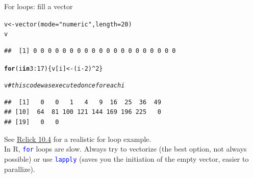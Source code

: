 \documentclass[xcolor=table,       handout,    xcolor=dvipsnames]{beamer}\usepackage[]{graphicx}\usepackage[]{color}
\makeatletter
\newcommand{\hlnum}[1]{\textcolor[rgb]{0,0,0}{#1}}
\newcommand{\hlstr}[1]{\textcolor[rgb]{0.545,0.137,0.137}{#1}}
\newcommand{\hlcom}[1]{\textcolor[rgb]{0,0.392,0}{\textit{#1}}}
\newcommand{\hlopt}[1]{\textcolor[rgb]{0,0,0}{#1}}
\newcommand{\hlstd}[1]{\textcolor[rgb]{0,0,0}{#1}}
\newcommand{\hlkwa}[1]{\textcolor[rgb]{1,0,0}{\textbf{#1}}}
\newcommand{\hlkwb}[1]{\textcolor[rgb]{0,0,0}{#1}}
\newcommand{\hlkwc}[1]{\textcolor[rgb]{1,0,1}{#1}}
\newcommand{\hlkwd}[1]{\textcolor[rgb]{0,0,1}{#1}}
\newenvironment{kframe}{%
 \def\at@end@of@kframe{}%
 \ifinner\ifhmode%
  \def\at@end@of@kframe{\end{minipage}}%
  \begin{minipage}{\columnwidth}%
 \fi\fi%
 \def\FrameCommand##1{\hskip\@totalleftmargin \hskip-\fboxsep
 \colorbox{shadecolor}{##1}\hskip-\fboxsep
     \hskip-\linewidth \hskip-\@totalleftmargin \hskip\columnwidth}%
 \MakeFramed {\advance\hsize-\width
   \@totalleftmargin\z@ \linewidth\hsize
   \@setminipage}}%
 {\par\unskip\endMakeFramed%
 \at@end@of@kframe}
\newenvironment{knitrout}{}{} %
\newcommand{\rcode}[1]{\texttt{\textcolor{Blue}{#1}}} %
\makeatother
\begin{document}

\begin{frame}[fragile]{For loops: fill a vector}
\begin{knitrout}
\color{fgcolor}\begin{kframe}
\begin{alltt}
\hlstd{v} \hlkwb{<-} \hlkwd{vector}\hlstd{(}\hlkwc{mode}\hlstd{=}\hlstr{"numeric"}\hlstd{,} \hlkwc{length}\hlstd{=}\hlnum{20}\hlstd{)}
\hlstd{v}
\end{alltt}
\begin{verbatim}
##  [1] 0 0 0 0 0 0 0 0 0 0 0 0 0 0 0 0 0 0 0 0
\end{verbatim}
\end{kframe}
\end{knitrout}
\pause \vspace{-1em}
\begin{knitrout}
\color{fgcolor}\begin{kframe}
\begin{alltt}
\hlkwa{for}\hlstd{(i} \hlkwa{in} \hlnum{3}\hlopt{:}\hlnum{17}\hlstd{)  \{  v[i]} \hlkwb{<-} \hlstd{(i}\hlopt{-}\hlnum{2}\hlstd{)}\hlopt{^}\hlnum{2}  \hlstd{\}}
\end{alltt}
\end{kframe}
\end{knitrout}
\pause \vspace{-1em}
\begin{knitrout}
\color{fgcolor}\begin{kframe}
\begin{alltt}
\hlstd{v} \hlcom{# this code was executed once for each i}
\end{alltt}
\begin{verbatim}
##  [1]   0   0   1   4   9  16  25  36  49
## [10]  64  81 100 121 144 169 196 225   0
## [19]   0   0
\end{verbatim}
\end{kframe}
\end{knitrout}
\pause \vspace{-0.5em}
See \href{https://rclickhandbuch.wordpress.com/hauptseite/}{Rclick 10.4} for a realistic for loop example.\\
\pause 
In R, \rcode{for} loops are slow. Always try to vectorize (the best option, not always possible) or use \rcode{lapply} (saves you the initiation of the empty vector, easier to parallize).
\end{frame}
\end{document}
